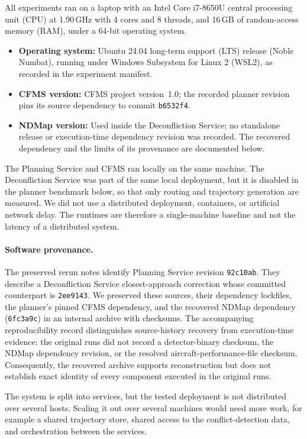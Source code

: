 All experiments ran on a laptop with an Intel Core i7-8650U central processing unit (CPU) at 1.90\,GHz with 4 cores and 8 threads, and 16\,GB of random-access memory (RAM), under a 64-bit operating system.

\begin{itemize}
    \item \textbf{Operating system:} Ubuntu 24.04 long-term support (LTS) release (Noble Numbat), running under Windows Subsystem for Linux 2 (WSL2), as recorded in the experiment manifest.
    \item \textbf{CFMS version:} CFMS project version~1.0; the recorded planner revision pins its source dependency to commit \texttt{b6532f4}.
    \item \textbf{NDMap version:} Used inside the Deconfliction Service; no standalone release or execution-time dependency revision was recorded. The recovered dependency and the limits of its provenance are documented below.
\end{itemize}

The Planning Service and CFMS ran locally on the same machine. The Deconfliction Service was part of the same local deployment, but it is disabled in the planner benchmark below, so that only routing and trajectory generation are measured. We did not use a distributed deployment, containers, or artificial network delay. The runtimes are therefore a single-machine baseline and not the latency of a distributed system.

\paragraph{Software provenance.}
The preserved rerun notes identify Planning Service revision \texttt{92c10ab}. They describe a Deconfliction Service closest-approach correction whose committed counterpart is \texttt{2ee9143}. We preserved these sources, their dependency lockfiles, the planner's pinned CFMS dependency, and the recovered NDMap dependency (\texttt{6fc3a9c}) in an internal archive with checksums. The accompanying reproducibility record distinguishes source-history recovery from execution-time evidence: the original runs did not record a detector-binary checksum, the NDMap dependency revision, or the resolved aircraft-performance-file checksum. Consequently, the recovered archive supports reconstruction but does not establish exact identity of every component executed in the original runs.

The system is split into services, but the tested deployment is not distributed over several hosts. Scaling it out over several machines would need more work, for example a shared trajectory store, shared access to the conflict-detection data, and orchestration between the services.

